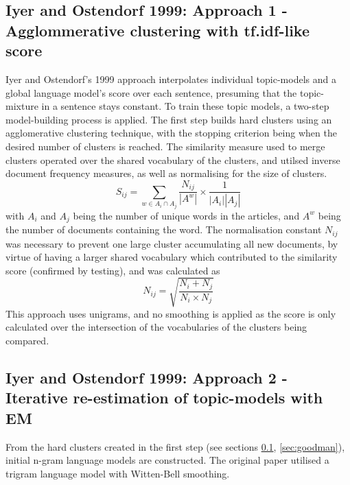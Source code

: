\documentclass{article}
\begin{document}
\subsection{Iyer and Ostendorf 1999: Approach 1 - Agglommerative clustering with tf.idf-like score} \label{sec:IO1}
Iyer and Ostendorf's 1999 approach interpolates individual topic-models and a global language model's score over each sentence, presuming that the topic-mixture in a sentence stays constant. To train these topic models, a two-step model-building process is applied. The first step builds hard clusters using an agglomerative clustering technique, with the stopping criterion being when the desired number of clusters is reached. The similarity measure used to merge clusters operated over the shared vocabulary of the clusters, and utilsed inverse document frequency measures, as well as normalising for the size of clusters.
\begin{equation}
S_{ij} = \sum_{w \in A_i \cap A_j}  \frac{N_{ij}}{|A^w|} \times \frac{1}{|A_i||A_j|}
\end{equation}
with $A_i$ and $A_j$ being the number of unique words in the articles, and $A^w$ being the number of documents containing the word. The normalisation constant $N_{ij}$ was necessary to prevent one large cluster accumulating all new documents, by virtue of having a larger shared vocabulary which contributed to the similarity score (confirmed by testing), and was calculated as 
\begin{equation}
N_{ij} = \sqrt{\frac{N_i+N_j}{N_i \times N_j}}
\end{equation}
This approach uses unigrams, and no smoothing is applied as the score is only calculated over the intersection of the vocabularies of the clusters being compared.


\subsection{Iyer and Ostendorf 1999: Approach 2 - Iterative re-estimation of topic-models with EM}
From the hard clusters created in the first step (see sections \ref{sec:IO1}, \ref{sec:goodman}), initial n-gram language models are constructed. The original paper utilised a trigram language model with Witten-Bell smoothing.
\end{document}
